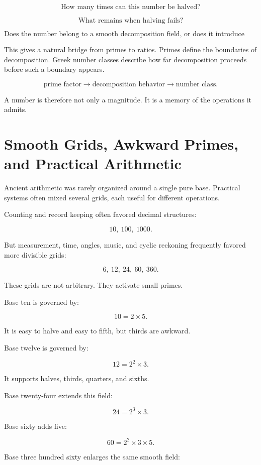 \documentclass[11pt]{book}
\begin{document}
\[
\text{How many times can this number be halved?}
\]

\[
\text{What remains when halving fails?}
\]

\[
\text{Does the number belong to a smooth decomposition field, or does it introduce resistance?}
\]

This gives a natural bridge from primes to ratios. Primes define the boundaries of decomposition.  Greek number classes describe how far decomposition proceeds before such a boundary appears.

\[
\text{prime factor}
\rightarrow
\text{decomposition behavior}
\rightarrow
\text{number class}.
\]

A number is therefore not only a magnitude. It is a memory of the operations it admits.

\section{Smooth Grids, Awkward Primes, and Practical Arithmetic}

Ancient arithmetic was rarely organized around a single pure base. Practical systems often mixed several grids, each useful for different operations.

Counting and record keeping often favored decimal structures:

\[
10,\ 100,\ 1000.
\]

But measurement, time, angles, music, and cyclic reckoning frequently favored more divisible grids:

\[
6,\ 12,\ 24,\ 60,\ 360.
\]

These grids are not arbitrary. They activate small primes.

Base ten is governed by:

\[
10 = 2 \times 5.
\]

It is easy to halve and easy to fifth, but thirds are awkward.

Base twelve is governed by:

\[
12 = 2^2 \times 3.
\]

It supports halves, thirds, quarters, and sixths.

Base twenty-four extends this field:

\[
24 = 2^3 \times 3.
\]

Base sixty adds five:

\[
60 = 2^2 \times 3 \times 5.
\]

Base three hundred sixty enlarges the same smooth field:
\end{document}
